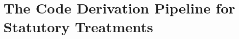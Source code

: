 \section{The Code Derivation Pipeline for Statutory Treatments}\label{sec:the-code-derivation-pipeline-for-statutory-treatments}


